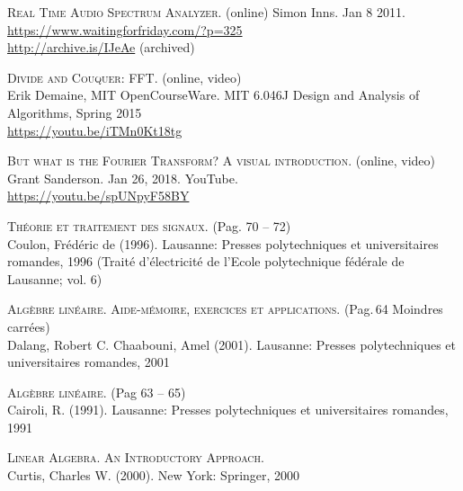 \begin{thebibliography}{2}

    \textsc{Real Time Audio Spectrum Analyzer}. (online) 
    Simon Inns. Jan 8 2011. \\
    \url{https://www.waitingforfriday.com/?p=325} \\
    \url{http://archive.is/IJeAe} (archived)

    \textsc{Divide and Couquer: FFT}. (online, video) \\
    Erik Demaine, MIT OpenCourseWare.
    MIT 6.046J Design and Analysis of Algorithms, Spring 2015 \\
    \url{https://youtu.be/iTMn0Kt18tg}

    \textsc{But what is the Fourier Transform? A visual introduction}. (online, video) \\
    Grant Sanderson. Jan 26, 2018. YouTube. \\
    \url{https://youtu.be/spUNpyF58BY}

    \textsc{Théorie et traitement des signaux}. (Pag. 70 -- 72) \\
    Coulon, Frédéric de (1996).
    Lausanne: Presses polytechniques et universitaires romandes, 1996
    (Traité d'électricité de l'Ecole polytechnique fédérale de Lausanne; vol. 6)

    \textsc{Algèbre linéaire. Aide-mémoire, exercices et applications}. (Pag.\,64 Moindres carrées) \\
    Dalang, Robert C. Chaabouni, Amel (2001). 
    Lausanne: Presses polytechniques et universitaires romandes, 2001

    \textsc{Algèbre linéaire}. (Pag 63 -- 65)\\
    Cairoli, R. (1991).
    Lausanne: Presses polytechniques et universitaires romandes, 1991

    \textsc{Linear Algebra. An Introductory Approach.} \\
    Curtis, Charles W. (2000).
    New York: Springer, 2000

\end{thebibliography}

\listoffigures
\begingroup
\let\clearpage\relax
\vspace{15mm}
\listoftables
\endgroup

